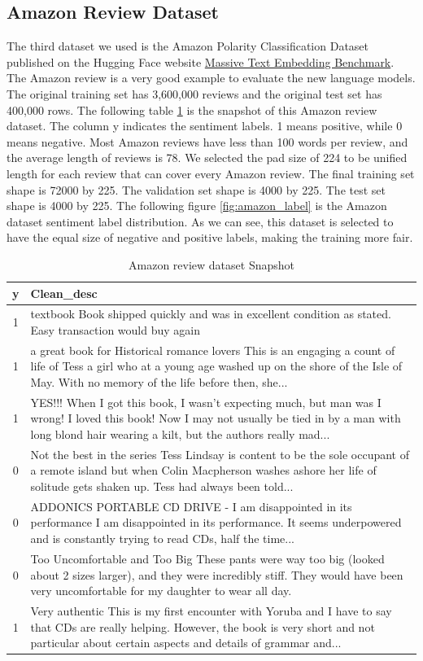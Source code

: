 \documentclass{article}
\begin{document}
\subsection{Amazon Review Dataset}
The third dataset we used is the Amazon Polarity Classification Dataset published on the Hugging Face website \hyperlink{https://huggingface.co/datasets/mteb/amazon_polarity}{Massive Text Embedding Benchmark}. The Amazon review is a very good example to evaluate the new language models. The original training set has 3,600,000 reviews and the original test set has 400,000 rows. The following table \ref{tab:amazon} is the snapshot of this Amazon review dataset. The column y indicates the sentiment labels. 1 means positive, while 0 means negative. Most Amazon reviews have less than 100 words per review, and the average length of reviews is 78. We selected the pad size of 224 to be unified length for each review that can cover every Amazon review. The final training set shape is 72000 by 225. The validation set shape is 4000 by 225. The test set shape is 4000 by 225. The following figure \ref{fig:amazon_label} is the Amazon dataset sentiment label distribution. As we can see, this dataset is selected to have the equal size of negative and positive labels, making the training more fair. 
\begin{table}[H]
    \centering
    \begin{tabular}{|c|p{16cm}|}
\hline y & Clean\_desc \\
\hline 1 & textbook Book shipped quickly and was in excellent condition as stated. Easy transaction would buy again  \\
\hline 1 & a great book for Historical romance lovers This is an engaging a count of life of Tess a girl who at a young age washed up on the shore of the Isle of May. With no memory of the life before then, she...\\
\hline 1 & YES!!! When I got this book, I wasn't expecting much, but man was I wrong! I loved this book! Now I may not usually be tied in by a man with long blond hair wearing a kilt, but the authors really mad...  \\
\hline 0 & Not the best in the series Tess Lindsay is content to be the sole occupant of a remote island but when Colin Macpherson washes ashore her life of solitude gets shaken up. Tess had always been told... \\
\hline 0 & ADDONICS PORTABLE CD DRIVE - I am disappointed in its performance I am disappointed in its performance. It seems underpowered and is constantly trying to read CDs, half the time... \\
\hline 0 & Too Uncomfortable and Too Big These pants were way too big (looked about 2 sizes larger), and they were incredibly stiff. They would have been very uncomfortable for my daughter to wear all day.\\
\hline 1 & Very authentic This is my first encounter with Yoruba and I have to say that CDs are really helping. However, the book is very short and not particular about certain aspects and details of grammar and... \\
\hline
\end{tabular}
    \caption{Amazon review dataset Snapshot}
    \label{tab:amazon}
\end{table}
\end{document}
